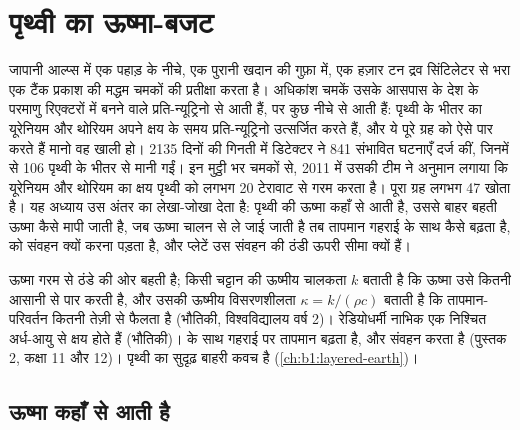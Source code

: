 \chapter{पृथ्वी का ऊष्मा-बजट}\label{ch:b1:heat-budget}

जापानी आल्प्स में एक पहाड़ के नीचे, एक पुरानी खदान की गुफ़ा में, एक हज़ार टन द्रव सिंटिलेटर से भरा एक टैंक प्रकाश की मद्धम चमकों की प्रतीक्षा करता है। अधिकांश चमकें उसके आसपास के देश के परमाणु रिएक्टरों में बनने वाले प्रति-न्यूट्रिनो से आती हैं, पर कुछ नीचे से आती हैं: पृथ्वी के भीतर का यूरेनियम और थोरियम अपने क्षय के समय प्रति-न्यूट्रिनो उत्सर्जित करते हैं, और ये पूरे ग्रह को ऐसे पार करते हैं मानो वह खाली हो। 2135 दिनों की गिनती में डिटेक्टर ने 841 संभावित घटनाएँ दर्ज कीं, जिनमें से 106 पृथ्वी के भीतर से मानी गईं। इन मुट्ठी भर चमकों से, 2011 में उसकी टीम ने अनुमान लगाया कि यूरेनियम और थोरियम का क्षय पृथ्वी को लगभग 20 टेरावाट से गरम करता है। पूरा ग्रह लगभग 47 खोता है। यह अध्याय उस अंतर का लेखा-जोखा देता है: पृथ्वी की ऊष्मा कहाँ से आती है, उससे बाहर बहती ऊष्मा कैसे मापी जाती है, जब ऊष्मा चालन से ले जाई जाती है तब तापमान गहराई के साथ कैसे बढ़ता है,  को संवहन क्यों करना पड़ता है, और प्लेटें उस संवहन की ठंडी ऊपरी सीमा क्यों हैं।

\begin{recall}
ऊष्मा गरम से ठंडे की ओर बहती है; किसी चट्टान की ऊष्मीय चालकता $k$ बताती है कि ऊष्मा उसे कितनी आसानी से पार करती है, और उसकी ऊष्मीय विसरणशीलता $\kappa = k/(\rho c)$ बताती है कि तापमान-परिवर्तन कितनी तेज़ी से फैलता है (भौतिकी, विश्वविद्यालय वर्ष 2)। रेडियोधर्मी नाभिक एक निश्चित अर्ध-आयु से क्षय होते हैं (भौतिकी)।  के साथ गहराई पर तापमान बढ़ता है, और  संवहन करता है (पुस्तक 2, कक्षा 11 और 12)।  पृथ्वी का सुदृढ़ बाहरी कवच है (\cref{ch:b1:layered-earth})।
\end{recall}

\section{ऊष्मा कहाँ से आती है}

